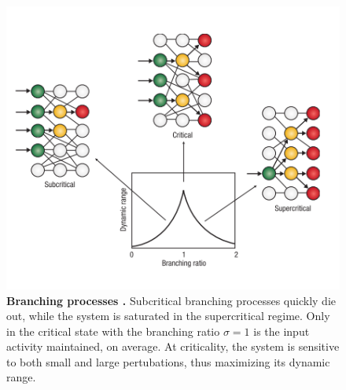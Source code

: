 \documentclass[12pt]{article}
\begin{document}
\begin{figure}      
  \begin{center}    
 \includegraphics[width=.7\textwidth]{Branchingprocesschialvo}    
    \caption{\textbf{Branching processes \cite{Chialvo2006a}.} Subcritical branching processes quickly die out, while the system is saturated in the supercritical regime. Only in the critical state with the branching ratio $\sigma = 1$ is the input activity maintained, on average. At criticality, the system is sensitive to both small and large pertubations, thus maximizing its dynamic range.}
   \label{Figure::Critical Branching Process}   
  \end{center}     
   \end{figure}
\end{document}
